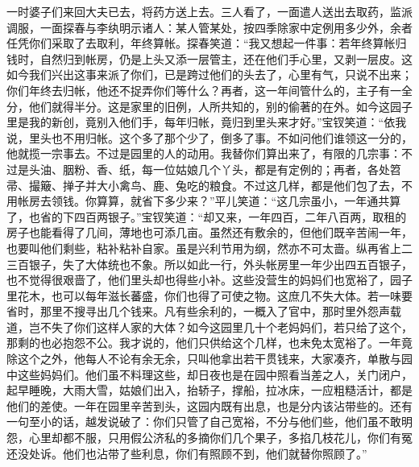 \begin{parag}


    一时婆子们来回大夫已去，将药方送上去。三人看了，一面遣人送出去取药，监派调服，一面探春与李纨明示诸人：某人管某处，按四季除家中定例用多少外，余者任凭你们采取了去取利，年终算帐。探春笑道：“我又想起一件事：若年终算帐归钱时，自然归到帐房，仍是上头又添一层管主，还在他们手心里，又剥一层皮。这如今我们兴出这事来派了你们，已是跨过他们的头去了，心里有气，只说不出来；你们年终去归帐，他还不捉弄你们等什么？再者，这一年间管什么的，主子有一全分，他们就得半分。这是家里的旧例，人所共知的，别的偷著的在外。如今这园子里是我的新创，竟别入他们手，每年归帐，竟归到里头来才好。”宝钗笑道：“依我说，里头也不用归帐。这个多了那个少了，倒多了事。不如问他们谁领这一分的，他就揽一宗事去。不过是园里的人的动用。我替你们算出来了，有限的几宗事：不过是头油、胭粉、香、纸，每一位姑娘几个丫头，都是有定例的；再者，各处笤帚、撮簸、掸子并大小禽鸟、鹿、兔吃的粮食。不过这几样，都是他们包了去，不用帐房去领钱。你算算，就省下多少来？”平儿笑道：“这几宗虽小，一年通共算了，也省的下四百两银子。”宝钗笑道：“却又来，一年四百，二年八百两，取租的房子也能看得了几间，薄地也可添几亩。虽然还有敷余的，但他们既辛苦闹一年，也要叫他们剩些，粘补粘补自家。虽是兴利节用为纲，然亦不可太啬。纵再省上二三百银子，失了大体统也不象。所以如此一行，外头帐房里一年少出四五百银子，也不觉得很艰啬了，他们里头却也得些小补。这些没营生的妈妈们也宽裕了，园子里花木，也可以每年滋长蕃盛，你们也得了可使之物。这庶几不失大体。若一味要省时，那里不搜寻出几个钱来。凡有些余利的，一概入了官中，那时里外怨声载道，岂不失了你们这样人家的大体？如今这园里几十个老妈妈们，若只给了这个，那剩的也必抱怨不公。我才说的，他们只供给这个几样，也未免太宽裕了。一年竟除这个之外，他每人不论有余无余，只叫他拿出若干贯钱来，大家凑齐，单散与园中这些妈妈们。他们虽不料理这些，却日夜也是在园中照看当差之人，关门闭户，起早睡晚，大雨大雪，姑娘们出入，抬轿子，撑船，拉冰床，一应粗糙活计，都是他们的差使。一年在园里辛苦到头，这园内既有出息，也是分内该沾带些的。还有一句至小的话，越发说破了：你们只管了自己宽裕，不分与他们些，他们虽不敢明怨，心里却都不服，只用假公济私的多摘你们几个果子，多掐几枝花儿，你们有冤还没处诉。他们也沾带了些利息，你们有照顾不到，他们就替你照顾了。”
\end{parag}


